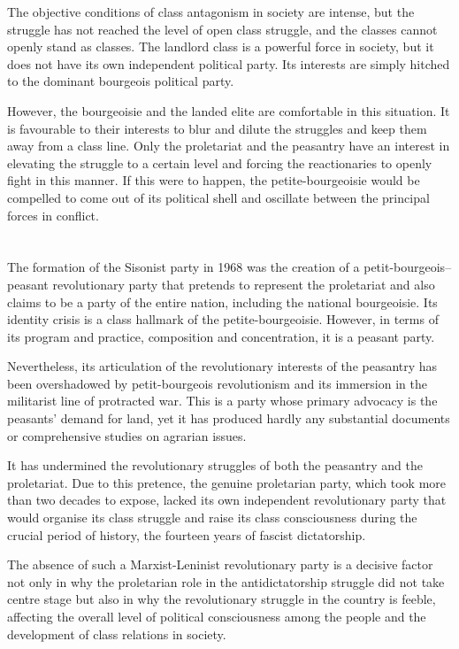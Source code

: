 The objective conditions of class antagonism in society are intense, 
but the struggle has not reached the level of open class struggle, 
and the classes cannot openly stand as classes. 
The landlord class is a powerful force in society, 
but it does not have its own independent political party. 
Its interests are simply hitched to the dominant bourgeois political party.

However, the bourgeoisie and the landed elite are comfortable in this situation. 
It is favourable to their interests to blur and dilute the struggles 
and keep them away from a class line. 
Only the proletariat and the peasantry have an interest 
in elevating the struggle to a certain level and forcing the reactionaries 
to openly fight in this manner. 
If this were to happen, the petite-bourgeoisie would be compelled 
to come out of its political shell 
and oscillate between the principal forces in conflict.

\section{}
The formation of the Sisonist party in 1968 was the creation 
of a petit-bourgeois--peasant revolutionary party that pretends to represent 
the proletariat and also claims to be a party of the entire nation, 
including the national bourgeoisie. 
Its identity crisis is a class hallmark of the petite-bourgeoisie. 
However, in terms of its program and practice, composition and concentration, 
it is a peasant party.

Nevertheless, its articulation of the revolutionary interests of the peasantry 
has been overshadowed by petit-bourgeois revolutionism 
and its immersion in the militarist line of protracted war. 
This is a party whose primary advocacy is the peasants' demand for land, 
yet it has produced hardly any substantial documents 
or comprehensive studies on agrarian issues.

It has undermined the revolutionary struggles of both 
the peasantry and the proletariat. 
Due to this pretence, the genuine proletarian party, 
which took more than two decades to expose, 
lacked its own independent revolutionary party that would organise 
its class struggle and raise its class consciousness during 
the crucial period of history, the fourteen years of fascist dictatorship.

The absence of such a Marxist-Leninist revolutionary party is a decisive factor
not only in why the proletarian role in the antidictatorship struggle 
did not take centre stage 
but also in why the revolutionary struggle in the country is feeble, 
affecting the overall level of political consciousness among the people 
and the development of class relations in society.

